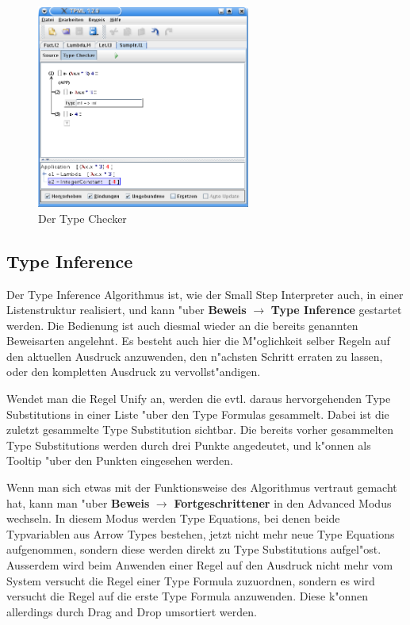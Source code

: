 \begin{figure}[h]
\begin{center}
\includegraphics[width=7cm]{images/type-checker.png}
\caption{Der Type Checker}
\label{FigureTypeChecker}
\end{center}
\end{figure}

\subsection{Type Inference}
Der Type Inference Algorithmus ist, wie der Small Step Interpreter 
auch, in einer Listenstruktur realisiert, und kann "uber {\bf Beweis} 
$\rightarrow$ {\bf Type Inference} gestartet werden. Die Bedienung ist auch diesmal 
wieder an die bereits genannten Beweisarten angelehnt. Es besteht 
auch hier die M"oglichkeit selber Regeln auf den aktuellen Ausdruck
anzuwenden, den n"achsten Schritt erraten zu lassen, oder den kompletten
Ausdruck zu vervollst"andigen.

Wendet man die Regel Unify an, werden die evtl. daraus hervorgehenden
Type Substitutions in einer Liste "uber den Type Formulas gesammelt. 
Dabei ist die zuletzt gesammelte Type Substitution sichtbar. Die bereits
vorher gesammelten Type Substitutions werden durch drei Punkte angedeutet,
und k"onnen als Tooltip "uber den Punkten eingesehen werden.

Wenn man sich etwas mit der Funktionsweise des Algorithmus vertraut gemacht hat,
kann man "uber {\bf Beweis} $\rightarrow$ {\bf Fortgeschrittener} in den 
Advanced Modus wechseln. In diesem Modus werden Type Equations, bei denen beide
Typvariablen aus Arrow Types bestehen, jetzt nicht mehr neue Type Equations
aufgenommen, sondern diese werden direkt zu Type Substitutions aufgel"ost.
Ausserdem wird beim Anwenden einer Regel auf den Ausdruck nicht mehr vom System
versucht die Regel einer Type Formula zuzuordnen, sondern es wird versucht die Regel
auf die erste Type Formula anzuwenden. Diese k"onnen allerdings durch Drag 
and Drop umsortiert werden.


